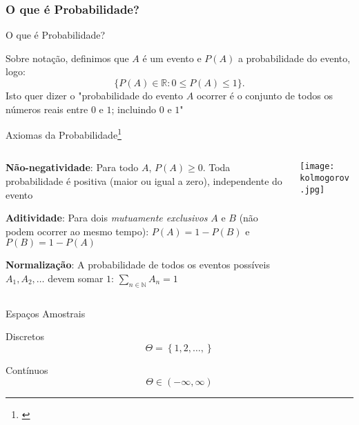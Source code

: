\subsubsection{O que é Probabilidade?}
\begin{frame}{O que é Probabilidade?}
    \begin{defn}[Probabilidade]
    Sobre notação, definimos que $A$ é um evento e $P(A)$ a probabilidade do evento, logo:
    $$
    \{P(A) \in \mathbb{R} : 0 \leq P(A) \leq 1 \}.
    $$
    \vfill
    Isto quer dizer o "probabilidade do evento $A$ ocorrer é o conjunto de
    todos os números reais entre $0$ e $1$; incluindo $0$ e $1$"
    \end{defn}
\end{frame}

\begin{frame}{Axiomas da Probabilidade\footnote{\textcite{kolmogorovFoundationsTheoryProbability1933}}}
    \begin{columns}
        \begin{column}{0.8\textwidth}
        \begin{vfilleditems}
            \item \textbf{Não-negatividade}: Para todo $A$, $P(A) \geq 0$.
            Toda probabilidade é positiva (maior ou igual a zero), independente do
            evento
            \item \textbf{Aditividade}: Para dois \textit{mutuamente exclusivos}
            $A$ e $B$ (não podem ocorrer ao mesmo tempo):
            $P(A) = 1 - P(B)$ e $P(B) = 1 - P(A)$
            \item \textbf{Normalização}: A probabilidade de todos os eventos
            possíveis $A_1, A_2, \dots$ devem somar $1$:
            $\sum_{n \in \mathbb{N}} A_n = 1$
        \end{vfilleditems}
        \end{column}
        \begin{column}{0.2\textwidth}
        \centering
        \texttt{[image: kolmogorov.jpg]}
        \end{column}
    \end{columns}
\end{frame}

\begin{frame}{Espaços Amostrais}
    \begin{vfilleditems}
        \item Discretos $$\Theta = \left\{1, 2, \ldots, \right\}$$
        \item Contínuos $$\Theta \in \left(-\infty, \infty \right)$$
    \end{vfilleditems}
\end{frame}

